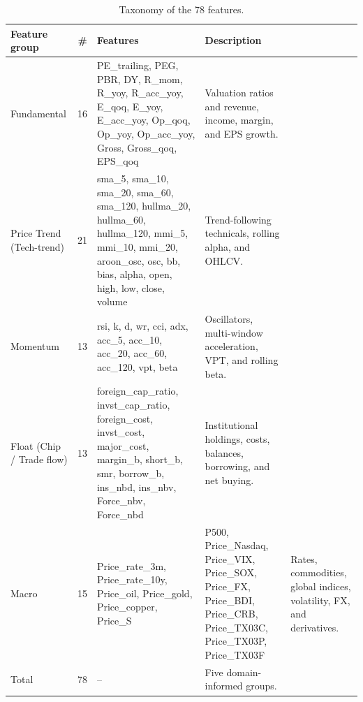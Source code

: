 \begin{table}[!t]
\centering
\caption{Taxonomy of the 78 features.}
\label{tab:feature_taxonomy}
\begin{tabular}{lrlp{8.5cm}}
\toprule
Feature group & \# & Features & Description \\
\midrule
Fundamental & 16 & PE\_trailing, PEG, PBR, DY, R\_mom, R\_yoy, R\_acc\_yoy, E\_qoq, E\_yoy, E\_acc\_yoy, Op\_qoq, Op\_yoy, Op\_acc\_yoy, Gross, Gross\_qoq, EPS\_qoq & Valuation ratios and revenue, income, margin, and EPS growth. \\
Price Trend (Tech-trend) & 21 & sma\_5, sma\_10, sma\_20, sma\_60, sma\_120, hullma\_20, hullma\_60, hullma\_120, mmi\_5, mmi\_10, mmi\_20, aroon\_osc, osc, bb, bias, alpha, open, high, low, close, volume & Trend-following technicals, rolling alpha, and OHLCV. \\
Momentum & 13 & rsi, k, d, wr, cci, adx, acc\_5, acc\_10, acc\_20, acc\_60, acc\_120, vpt, beta & Oscillators, multi-window acceleration, VPT, and rolling beta. \\
Float (Chip / Trade flow) & 13 & foreign\_cap\_ratio, invst\_cap\_ratio, foreign\_cost, invst\_cost, major\_cost, margin\_b, short\_b, smr, borrow\_b, ins\_nbd, ins\_nbv, Force\_nbv, Force\_nbd & Institutional holdings, costs, balances, borrowing, and net buying. \\
Macro & 15 & Price\_rate\_3m, Price\_rate\_10y, Price\_oil, Price\_gold, Price\_copper, Price\_S&P500, Price\_Nasdaq, Price\_VIX, Price\_SOX, Price\_FX, Price\_BDI, Price\_CRB, Price\_TX03C, Price\_TX03P, Price\_TX03F & Rates, commodities, global indices, volatility, FX, and derivatives. \\
\midrule
Total & 78 & -- & Five domain-informed groups. \\
\bottomrule
\end{tabular}
\end{table}
